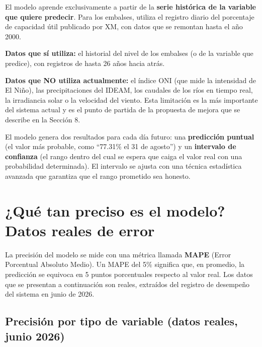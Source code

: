 \documentclass[11pt,a4paper]{article}
\begin{document}
El modelo aprende exclusivamente a partir de la \textbf{serie histórica de la variable que quiere predecir}. Para los embalses, utiliza el registro diario del porcentaje de capacidad útil publicado por XM, con datos que se remontan hasta el año 2000.

\begin{infobox}
\textbf{Datos que sí utiliza:} el historial del nivel de los embalses (o de la variable que predice), con registros de hasta 26 años hacia atrás.

\textbf{Datos que NO utiliza actualmente:} el índice ONI (que mide la intensidad de El Niño), las precipitaciones del IDEAM, los caudales de los ríos en tiempo real, la irradiancia solar o la velocidad del viento. Esta limitación es la más importante del sistema actual y es el punto de partida de la propuesta de mejora que se describe en la Sección 8.
\end{infobox}

El modelo genera dos resultados para cada día futuro: una \textbf{predicción puntual} (el valor más probable, como ``77.31\% el 31 de agosto'') y un \textbf{intervalo de confianza} (el rango dentro del cual se espera que caiga el valor real con una probabilidad determinada). El intervalo se ajusta con una técnica estadística avanzada que garantiza que el rango prometido sea honesto.

\section{¿Qué tan preciso es el modelo? Datos reales de error}

La precisión del modelo se mide con una métrica llamada \textbf{MAPE} (Error Porcentual Absoluto Medio). Un MAPE del 5\% significa que, en promedio, la predicción se equivoca en 5 puntos porcentuales respecto al valor real. Los datos que se presentan a continuación son reales, extraídos del registro de desempeño del sistema en junio de 2026.

\subsection{Precisión por tipo de variable (datos reales, junio 2026)}
\end{document}
